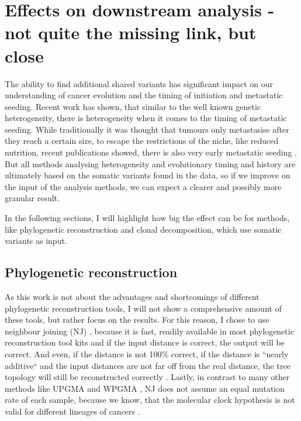 \section[Effects on downstream analysis]{Effects on downstream analysis - not quite the missing link, but close}
\label{variantcalling-sec:downstream}

The ability to find additional shared variants has significant impact on our understanding of cancer evolution and the timing of initiation and metastatic seeding. Recent work has shown, that similar to the well known genetic heterogeneity, there is heterogeneity when it comes to the timing of metastatic seeding. While traditionally it was thought that tumours only metastasise after they reach a certain size, to escape the restrictions of the niche, like reduced nutrition, recent publications showed, there is also very early metastatic seeding \cite{Hu2019}. 
But all methods analysing heterogeneity and evolutionary timing and history are ultimately based on the somatic variants found in the data, so if we improve on the input of the analysis methods, we can expect a clearer and possibly more granular result.

In the following sections, I will highlight how big the effect can be for methods, like phylogenetic reconstruction and clonal decomposition, which use somatic variants as input.


\subsection[Phylogenetic reconstruction]{Phylogenetic reconstruction}
\label{variantcalling-sec:phylo}
As this work is not about the advantages and shortcomings of different phylogenetic reconstruction tools, I will not show a comprehensive amount of these tools, but rather focus on the results.  For this reason, I chose to use neighbour joining (NJ) \cite{Saitou1987}, because it is fast, readily available in most phylogenetic reconstruction tool kits and if the input distance is correct, the output will be correct. And even, if the distance is not 100\% correct, if the distance is ``nearly additive`` and the input distances are not far off from the real distance, the tree topology will still be reconstructed correctly \cite{Mihaescu2007}. Lastly, in contrast to many other methods like UPGMA and WPGMA \cite{Sokal1958}, NJ does not assume an equal mutation rate of each sample, because we know, that the molecular clock hypothesis \cite{Zuckerkandl1962} is not valid for different lineages of cancers \cite{Shibata2010}.

